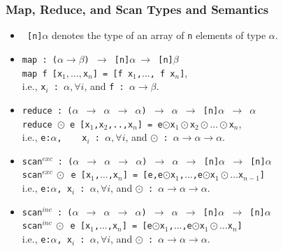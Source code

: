 \documentclass{beamer}
\renewcommand{\emph}[1]{\textcolor{structure}{#1}}
\newcommand{\emp}[1]{\textcolor{DikuRed}{ #1}}
\begin{document}
\begin{frame}[fragile,t]
  \frametitle{Map, Reduce, and Scan Types and Semantics}

\begin{itemize}
    \item {\tt \emp{[n]$\alpha$}} denotes the type of an array of \emp{\tt n} elements of type \emp{$\alpha$}.\smallskip
    \item \emp{\tt map~:~($\alpha\rightarrow\beta$)~$\rightarrow$~[n]$\alpha~\rightarrow$~[n]$\beta$}\\
    \emph{\tt map f [x$_1,\ldots, $x$_n$] = [f x$_1$,$\ldots$, f x$_n$]},\\  
        i.e., \emp{\tt{}x$_i$~:~$\alpha, \forall i$}, and 
        \emp{\tt f~:~$\alpha\rightarrow\beta$}.\medskip

    \item \emp{{\tt reduce~:~($\alpha$~$\rightarrow$~$\alpha$~$\rightarrow$~$\alpha$)~$\rightarrow$~$\alpha$~$\rightarrow$~[n]$\alpha$~$\rightarrow$~$\alpha$}}\\
        \emph{\tt reduce $\odot$~e~[x$_1$,x$_2$,..,x$_n$]~=~e$\odot$x$_1\odot$x$_2\odot\ldots\odot$x$_n$},\\
        i.e., \emp{{\tt{}e:$\alpha$, ~~ x$_i$~:~$\alpha, \forall i$}}, and 
        \emp{\tt $\odot$~:~$\alpha\rightarrow\alpha\rightarrow\alpha$}.\medskip

    \item \emp{{\tt scan$^{exc}$~:~($\alpha$~$\rightarrow$~$\alpha$~$\rightarrow$~$\alpha$)~$\rightarrow$~$\alpha$~$\rightarrow$~[n]$\alpha$~$\rightarrow$~[n]$\alpha$}}\\
        \emph{\tt scan$^{exc}~\odot$~e~[x$_1$,$\ldots$,x$_n$]~=~[e,e$\odot$x$_1$,$\ldots$,e$\odot$x$_1\odot\ldots$x$_{n-1}$]}\\
        i.e., \emp{{\tt{}e:$\alpha$, x$_i$~:~$\alpha, \forall i$}}, and 
        \emp{\tt $\odot$~:~$\alpha\rightarrow\alpha\rightarrow\alpha$}.\medskip

    \item \emp{{\tt scan$^{inc}$~:~($\alpha$~$\rightarrow$~$\alpha$~$\rightarrow$~$\alpha$)~$\rightarrow$~$\alpha$~$\rightarrow$~[n]$\alpha$~$\rightarrow$~[n]$\alpha$}}\\
        \emph{\tt scan$^{inc}~\odot$~e~[x$_1$,$\ldots$,x$_n$]~=~[e$\odot$x$_1$,$\ldots$,e$\odot$x$_1\odot\ldots$x$_{n}$]}\\
        i.e., \emp{{\tt{}e:$\alpha$, x$_i$~:~$\alpha, \forall i$}}, and 
        \emp{\tt $\odot$~:~$\alpha\rightarrow\alpha\rightarrow\alpha$}.

\end{itemize}

\end{frame}
\end{document}
